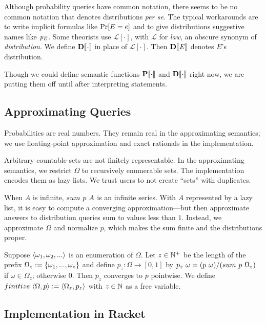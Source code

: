 Although probability queries have common notation, there seems to be no common notation that denotes distributions \textit{per se}. The typical workarounds are to write implicit formulas like $\mathrm{Pr}\!\left[{E=e}\right]$ and to give distributions suggestive names like $\mathit{p_E}$. Some theorists use $\mathcal{L}[\cdot]$, with $\mathcal{L}$ for \textit{law}, an obscure synonym of \textit{distribution}. We define $\mathbf{D}\!\left\llbracket{\cdot}\right\rrbracket$ in place of $\mathcal{L}[\cdot]$. Then $\mathbf{D}\!\left\llbracket{\mathit{E}}\right\rrbracket$ denotes $E$'s distribution.

Though we could define semantic functions $\mathbf{P}\!\left\llbracket{\cdot}\right\rrbracket$ and $\mathbf{D}\!\left\llbracket{\cdot}\right\rrbracket$ right now, we are putting them off until after interpreting statements.

\subsection{Approximating Queries}

Probabilities are real numbers. They remain real in the approximating semantics; we use floating-point approximation and exact rationals in the implementation.

Arbitrary countable sets are not finitely representable. In the approximating semantics, we restrict $\Omega$ to recursively enumerable sets. The implementation encodes them as lazy lists. We trust users to not create ``sets'' with duplicates.

When $A$ is infinite, $sum~p~A$ is an infinite series. With $A$ represented by a lazy list, it is easy to compute a converging approximation---but then approximate answers to distribution queries sum to values less than $1$. Instead, we approximate $\Omega$ and normalize $p$, which makes the sum finite and the distributions proper.

Suppose $\langle{\omega_1,\omega_2,...}\rangle$ is an enumeration of $\Omega$. Let $z \in \mathbb{N}^+$ be the length of the prefix $\Omega_z := \{{\omega_1,...,\omega_z}\}$ and define $p_z : \Omega \to [0,1]$ by $p_z~\omega = {\left({p}\ {\omega}\right)} / {\left({sum}\ {p}\ {\Omega_z}\right)}$ if $\omega \in \Omega_z$; otherwise $0$. Then $p_z$ converges to $p$ pointwise.
We define ${finitize}\ {\langle{\Omega,p}\rangle} := \langle{\Omega_z,p_z}\rangle$ with $z\in\mathbb{N}$ as a free variable.

\subsection{Implementation in Racket}

